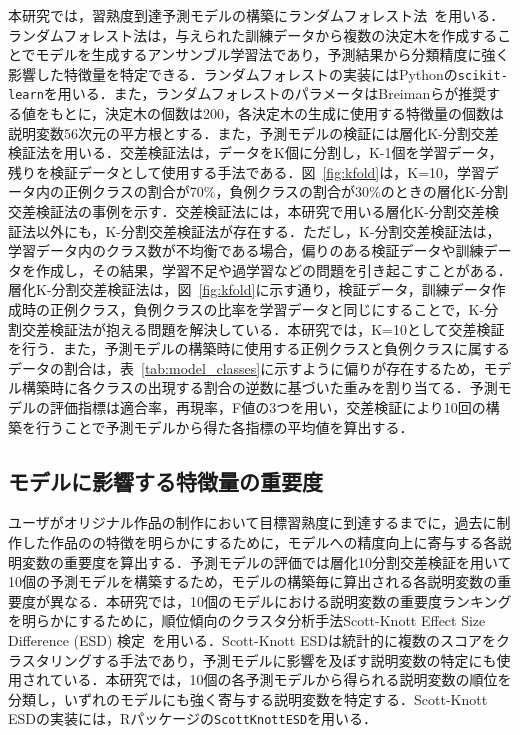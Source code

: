\documentclass[submit]{ipsj}
\begin{document}
本研究では，習熟度到達予測モデルの構築にランダムフォレスト法~\cite{Breiman_2001}を用いる．ランダムフォレスト法は，与えられた訓練データから複数の決定木を作成することでモデルを生成するアンサンブル学習法であり，予測結果から分類精度に強く影響した特徴量を特定できる．ランダムフォレストの実装にはPythonの\texttt{scikit-learn}を用いる．また，ランダムフォレストのパラメータはBreimanらが推奨する値をもとに，決定木の個数は200，各決定木の生成に使用する特徴量の個数は説明変数56次元の平方根とする．また，予測モデルの検証には層化K-分割交差検証法を用いる．交差検証法は，データをK個に分割し，K-1個を学習データ，残りを検証データとして使用する手法である．図~\ref{fig:kfold}は，K=10，学習データ内の正例クラスの割合が70\%，負例クラスの割合が30\%のときの層化K-分割交差検証法の事例を示す．交差検証法には，本研究で用いる層化K-分割交差検証法以外にも，K-分割交差検証法が存在する．ただし，K-分割交差検証法は，学習データ内のクラス数が不均衡である場合，偏りのある検証データや訓練データを作成し，その結果，学習不足や過学習などの問題を引き起こすことがある．層化K-分割交差検証法は，図~\ref{fig:kfold}に示す通り，検証データ，訓練データ作成時の正例クラス，負例クラスの比率を学習データと同じにすることで，K-分割交差検証法が抱える問題を解決している．本研究では，K=10として交差検証を行う．また，予測モデルの構築時に使用する正例クラスと負例クラスに属するデータの割合は，表~\ref{tab:model_classes}に示すように偏りが存在するため，モデル構築時に各クラスの出現する割合の逆数に基づいた重みを割り当てる．予測モデルの評価指標は適合率，再現率，F値の3つを用い，交差検証により10回の構築を行うことで予測モデルから得た各指標の平均値を算出する．


\subsection{モデルに影響する特徴量の重要度}
ユーザがオリジナル作品の制作において目標習熟度に到達するまでに，過去に制作した作品の\textcolor{red}{}の特徴を明らかにするために，モデルへの精度向上に寄与する各説明変数の重要度を算出する．予測モデルの評価では層化10分割交差検証を用いて10個の予測モデルを構築するため，モデルの構築毎に算出される各説明変数の重要度が異なる．本研究では，10個のモデルにおける説明変数の重要度ランキングを明らかにするために，順位傾向のクラスタ分析手法Scott-Knott Effect Size Difference (ESD) 検定~\cite{Tantithamthavorn_2019}を用いる．Scott-Knott ESDは統計的に複数のスコアをクラスタリングする手法であり，予測モデルに影響を及ぼす説明変数の特定にも使用されている．本研究では，10個の各予測モデルから得られる説明変数の順位を分類し，いずれのモデルにも強く寄与する説明変数を特定する．Scott-Knott ESDの実装には，Rパッケージの\texttt{ScottKnottESD}を用いる．
\end{document}
